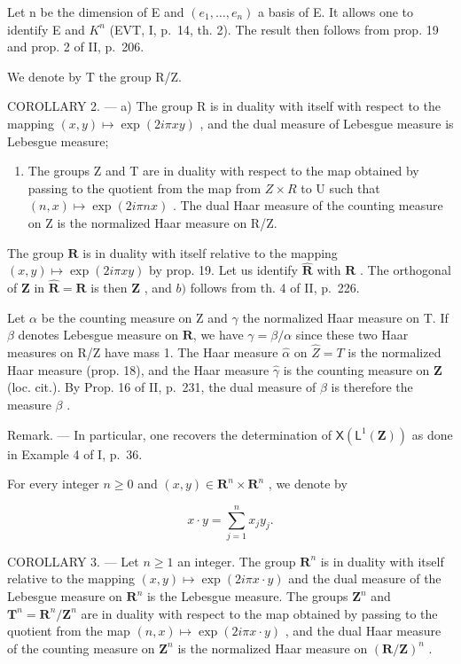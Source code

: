 Let n be the dimension of E and \((e_{1},\ldots,e_{n})\) a basis of E. It allows one to identify E and \(K^{n}\) (EVT, I, p.~14, th. 2). The result then follows from prop. 19 and prop. 2 of II, p.~206.

We denote by T the group R/Z.

COROLLARY 2. --- a) The group R is in duality with itself with respect to the mapping \((x,y)\mapsto\exp(2i\pi xy)\) , and the dual measure of Lebesgue measure is Lebesgue measure;

\begin{enumerate}
\def\labelenumi{\alph{enumi})}
\setcounter{enumi}{1}
\tightlist
\item
  The groups Z and T are in duality with respect to the map obtained by passing to the quotient from the map from \(Z \times R\) to U such that \((n, x) \mapsto \exp(2i\pi nx)\) . The dual Haar measure of the counting measure on Z is the normalized Haar measure on R/Z.
\end{enumerate}

The group \(\mathbf{R}\) is in duality with itself relative to the mapping \((x,y)\mapsto \exp (2i\pi xy)\) by prop. 19. Let us identify \(\widehat{\mathbf{R}}\) with \(\mathbf{R}\) . The orthogonal of \(\mathbf{Z}\) in \(\widehat{\mathbf{R}} = \mathbf{R}\) is then \(\mathbf{Z}\) , and \(b)\) follows from th. 4 of II, p.~226.

Let \(\alpha\) be the counting measure on Z and \(\gamma\) the normalized Haar measure on T. If \(\beta\) denotes Lebesgue measure on \(\mathbf{R}\), we have \(\gamma = \beta/\alpha\) since these two Haar measures on R/Z have mass 1. The Haar measure \(\widehat{\alpha}\) on \(\widehat{Z} = T\) is the normalized Haar measure (prop. 18), and the Haar measure \(\widehat{\gamma}\) is the counting measure on \(\mathbf{Z}\) (loc. cit.). By Prop. 16 of II, p.~231, the dual measure of \(\beta\) is therefore the measure \(\beta\) .

Remark. --- In particular, one recovers the determination of \(\mathsf{X}(\mathsf{L}^{1}(\mathbf{Z}))\) as done in Example 4 of I, p.~36.

For every integer \(n \geqslant 0\) and \((x, y) \in \mathbf{R}^n \times \mathbf{R}^n\) , we denote by

\[
x \cdot y = \sum_ {j = 1} ^ {n} x _ {j} y _ {j}.
\]

COROLLARY 3. --- Let \(n \geqslant 1\) an integer. The group \(\mathbf{R}^{n}\) is in duality with itself relative to the mapping \((x,y) \mapsto \exp(2i\pi x \cdot y)\) and the dual measure of the Lebesgue measure on \(\mathbf{R}^{n}\) is the Lebesgue measure. The groups \(\mathbf{Z}^{n}\) and \(\mathbf{T}^{n} = \mathbf{R}^{n}/\mathbf{Z}^{n}\) are in duality with respect to the map obtained by passing to the quotient from the map \((n,x) \mapsto \exp(2i\pi x \cdot y)\) , and the dual Haar measure of the counting measure on \(\mathbf{Z}^{n}\) is the normalized Haar measure on \((\mathbf{R}/\mathbf{Z})^{n}\) .

